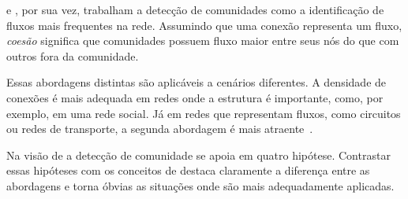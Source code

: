 \documentclass[12pt,a4paper]{article}
\begin{document}
 e , por sua vez, trabalham a detecção de comunidades como a identificação de fluxos mais frequentes na rede. Assumindo que uma conexão representa um fluxo, \textit{coesão} significa que comunidades possuem fluxo maior entre seus nós do que com outros fora da comunidade.

Essas abordagens distintas são aplicáveis a cenários diferentes. A densidade de conexões é mais adequada em redes onde a estrutura é importante, como, por exemplo, em uma rede social. Já em redes que representam fluxos, como circuitos ou redes de transporte, a segunda abordagem é mais atraente~\cite{Rosvall2009-sd}.

Na visão de  a detecção de comunidade se apoia em quatro hipótese. Contrastar essas hipóteses com os conceitos de  destaca claramente a diferença entre as abordagens e torna óbvias as situações onde são mais adequadamente aplicadas.
\end{document}
